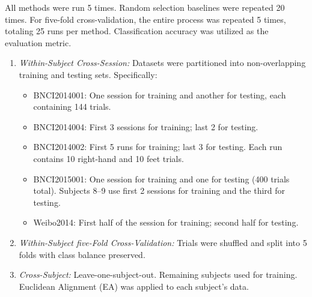 \documentclass[journal,twocolumn]{IEEEtran}
\begin{document}
All methods were run 5 times. Random selection baselines were repeated 20 times. For five-fold cross-validation, the entire process was repeated 5 times, totaling 25 runs per method. Classification accuracy was utilized as the evaluation metric.

\begin{enumerate}
  \item \emph{Within-Subject Cross-Session:}
Datasets were partitioned into non-overlapping training and testing sets. Specifically:
  \begin{itemize}
    \item BNCI2014001: One session for training and another for testing, each containing 144 trials.
    \item BNCI2014004: First 3 sessions for training; last 2 for testing.
    \item BNCI2014002: First 5 runs for training; last 3 for testing. Each run contains 10 right-hand and 10 feet trials.
    \item BNCI2015001: One session for training and one for testing (400 trials total). Subjects 8–9 use first 2 sessions for training and the third for testing.
    \item Weibo2014: First half of the session for training; second half for testing.
  \end{itemize}

  \item \emph{Within-Subject five-Fold Cross-Validation:}
Trials were shuffled and split into 5 folds with class balance preserved.

  \item \emph{Cross-Subject:}
Leave-one-subject-out. Remaining subjects used for training. Euclidean Alignment (EA) \cite{he2019transfer} was applied to each subject's data.
\end{enumerate}
\end{document}
